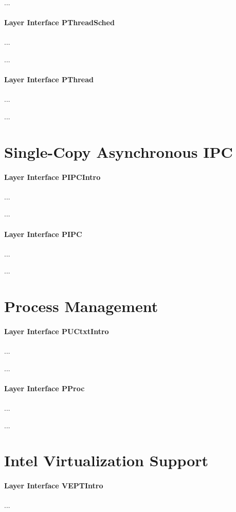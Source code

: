 ...

\paragraph{Layer Interface PThreadSched}
...

...

\paragraph{Layer Interface PThread}
...

...

\section{Single-Copy Asynchronous IPC}

\paragraph{Layer Interface PIPCIntro}
...

...

\paragraph{Layer Interface PIPC}
...

...

\section{Process Management}

\paragraph{Layer Interface PUCtxtIntro}
...

...

\paragraph{Layer Interface PProc}
...

...

\section{Intel Virtualization Support}

\paragraph{Layer Interface VEPTIntro}
...

